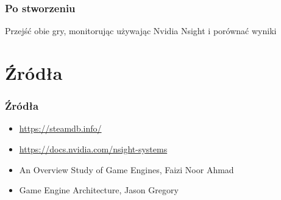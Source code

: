 \documentclass{beamer}
\begin{document}
      \begin{frame} 
        \frametitle{Po stworzeniu}
        Przejść obie gry, monitorując używając Nvidia Nsight i porównać wyniki
      \end{frame}


    \section{Źródła}
\begin{frame}
  \frametitle{Źródła}
    \begin{itemize}
        \item \href{https://steamdb.info/}{https://steamdb.info/}
    \item \href{https://docs.nvidia.com/nsight-systems}{https://docs.nvidia.com/nsight-systems}
    \item An Overview Study of Game Engines, Faizi Noor Ahmad 
    \item Game Engine Architecture, Jason Gregory
    \end{itemize}
    \end{frame}
\end{document}
